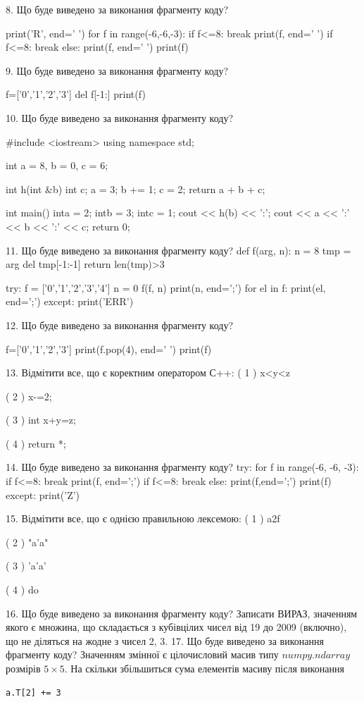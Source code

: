 \documentclass[11pt]{article}
\begin{document}
8. Що буде виведено за виконання фрагменту коду?

print('R', end=' ')
for f in range(-6,-6,-3):
    if f<=8:
        break
        print(f, end=' ')
    if f<=8:
        break
    else:
        print(f, end=' ')
    print(f)

9. Що буде виведено за виконання фрагменту коду?

f=['0','1','2','3']
del f[-1:]
print(f)


10. Що буде виведено за виконання фрагменту коду?

#include <iostream>
using namespace std;

int a = 8, b = 0, c = 6;

int h(int &b){
int c;    a = 3;
    b += 1;
    c = 2;
    return a + b + c;
}

int main(){
    inta = 2;
    intb = 3;
    intc = 1;
    cout << h(b) << ':';
    cout << a << ':' << b << ':' << c;
    return 0; 
}

11. Що буде виведено за виконання фрагменту коду?
def f(arg, n):
    n = 8
    tmp = arg
    del tmp[-1:-1]
    return len(tmp)>3

try:
    f = ['0','1','2','3','4']
    n = 0
    f(f, n)
    print(n, end=';')
    for el in f:
        print(el, end=';')
except:
    print('ERR')

12. Що буде виведено за виконання фрагменту коду?

f=['0','1','2','3']
print(f.pop(4), end=' ')
print(f)


13. Відмітити все, що є коректним оператором С++:
( 1 ) x<y<z

( 2 ) x-=2;

( 3 ) int x+y=z;

( 4 ) return *;

14. Що буде виведено за виконання фрагменту коду?
try:
    for f in range(-6, -6, -3):
        if f<=8:
            break
        print(f, end=';')
        if f<=8:
            break
    else:
        print(f,end=';')
    print(f)
except:
    print('Z')

15. Відмітити все, що є однією правильною лексемою:
( 1 ) a2f

( 2 ) "a'a"

( 3 ) 'a'a'

( 4 ) do

16. Що буде виведено за виконання фрагменту коду?
Записати ВИРАЗ, значенням якого є множина, що складається з кубівцілих чисел від 19 до 2009 (включно), що не діляться на жодне з чисел 2, 3.
17. Що буде виведено за виконання фрагменту коду?
Значенням змінної  є цілочисловий масив типу $numpy.ndarray$ розмірів $5{\times}5$. На скільки збільшиться сума елементів масиву  після виконання
\begin{verbatim}
a.T[2] += 3
\end{verbatim}
\end{document}
